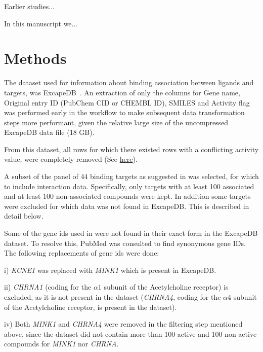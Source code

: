 \documentclass[utf8]{frontiersSCNS} %
\begin{document}
Earlier studies...


In this manuscript we...



\section{Methods}

The dataset used for information about binding association between ligands
and targets, was ExcapeDB~\cite{Sun2017}. An extraction of only the columns
for Gene name, Original entry ID (PubChem CID or CHEMBL ID), SMILES and
Activity flag was performed early in the workflow to make subsequent data
transformation steps more performant, given the relative large size of the
uncompressed ExcapeDB data file (18 GB).

From this dataset, all rows for which there existed rows with a conflicting
activity value, were completely removed (See \href{https://github.com/pharmbio/ptp-project/blob/c529cf/exp/20180426-wo-drugbank/wo_drugbank_wf.go#L239-L246}{here}).

A subset of the panel of 44 binding targets as suggested in \cite{Bowes2012}
was selected, for which to include interaction data. Specifically, only targets
with at least 100 associated and at least 100 non-associated compounds were
kept. In addition some targets were excluded for which data was not found in
ExcapeDB. This is described in detail below.

Some of the gene ids used in \cite{Bowes2012} were not found in their exact
form in the ExcapeDB dataset. To resolve this, PubMed was consulted to find
synonymous gene IDs. The following replacements of gene ids were done:

i) \textit{KCNE1} was replaced with \textit{MINK1} which is present in ExcapeDB.

ii) \textit{CHRNA1} (coding for the $\alpha1$ subunit of the Acetylcholine
receptor) is excluded, as it is not present in the dataset (\textit{CHRNA4},
coding for the $\alpha4$ subunit of the Acetylcholine receptor, is present in
the dataset).

iv) Both \textit{MINK1} and \textit{CHRNA4} were removed in the filtering
step mentioned above, since the dataset did not contain more than 100 active
and 100 non-active compounds for \textit{MINK1} nor \textit{CHRNA}.
\end{document}

